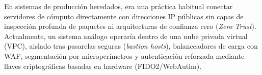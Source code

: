 \begin{perspectiva20}
En sistemas de producción heredados, era una práctica habitual conectar servidores de cómputo directamente con direcciones IP públicas sin capas de inspección profunda de paquetes ni arquitecturas de confianza cero (\textit{Zero Trust}). Actualmente, un sistema análogo operaría dentro de una nube privada virtual (VPC), aislado tras pasarelas seguras (\textit{bastion hosts}), balanceadores de carga con WAF, segmentación por microperímetros y autenticación reforzada mediante llaves criptográficas basadas en hardware (FIDO2/WebAuthn).
\end{perspectiva20}
